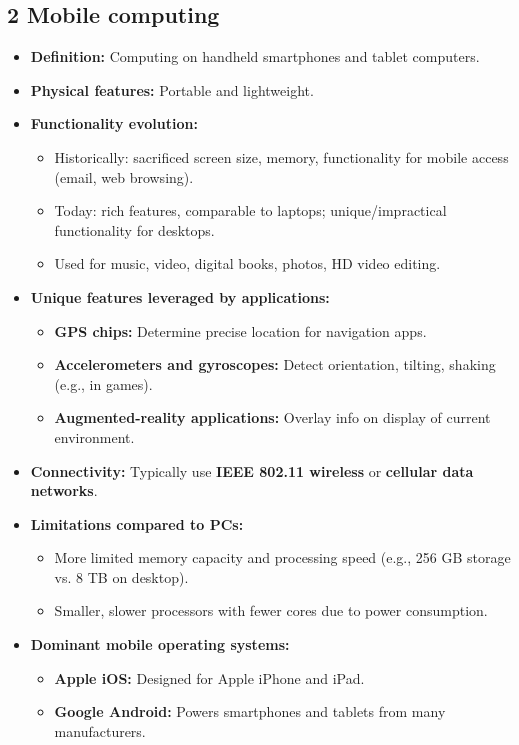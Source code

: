 \documentclass{article}
\begin{document}
\subsection*{2 Mobile computing}
\begin{itemize}
    \item \textbf{Definition:} Computing on handheld smartphones and tablet computers.
    \item \textbf{Physical features:} Portable and lightweight.
    \item \textbf{Functionality evolution:}
    \begin{itemize}
        \item Historically: sacrificed screen size, memory, functionality for mobile access (email, web browsing).
        \item Today: rich features, comparable to laptops; unique/impractical functionality for desktops.
        \item Used for music, video, digital books, photos, HD video editing.
    \end{itemize}
    \item \textbf{Unique features leveraged by applications:}
    \begin{itemize}
        \item \textbf{GPS chips:} Determine precise location for navigation apps.
        \item \textbf{Accelerometers and gyroscopes:} Detect orientation, tilting, shaking (e.g., in games).
        \item \textbf{Augmented-reality applications:} Overlay info on display of current environment.
    \end{itemize}
    \item \textbf{Connectivity:} Typically use \textbf{IEEE 802.11 wireless} or \textbf{cellular data networks}.
    \item \textbf{Limitations compared to PCs:}
    \begin{itemize}
        \item More limited memory capacity and processing speed (e.g., 256 GB storage vs. 8 TB on desktop).
        \item Smaller, slower processors with fewer cores due to power consumption.
    \end{itemize}
    \item \textbf{Dominant mobile operating systems:}
    \begin{itemize}
        \item \textbf{Apple iOS:} Designed for Apple iPhone and iPad.
        \item \textbf{Google Android:} Powers smartphones and tablets from many manufacturers.
    \end{itemize}
\end{itemize}
\end{document}
